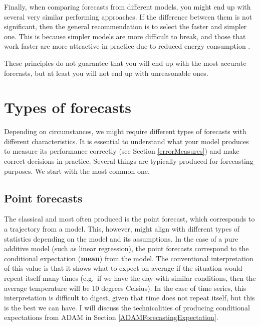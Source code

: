 \documentclass[]{book}
\theoremstyle{definition}
\theoremstyle{definition}
\theoremstyle{definition}
\theoremstyle{definition}
\theoremstyle{remark}
\begin{document}
Finally, when comparing forecasts from different models, you might end up with several very similar performing approaches. If the difference between them is not significant, then the general recommendation is to select the faster and simpler one. This is because simpler models are more difficult to break, and those that work faster are more attractive in practice due to reduced energy consumption \citep[save the planet and stop global warming!][]{Dhar2020}.

These principles do not guarantee that you will end up with the most accurate forecasts, but at least you will not end up with unreasonable ones.

\hypertarget{typesOfForecasts}{%
\section{Types of forecasts}\label{typesOfForecasts}}

Depending on circumstances, we might require different types of forecasts with different characteristics. It is essential to understand what your model produces to measure its performance correctly (see Section \ref{errorMeasures}) and make correct decisions in practice. Several things are typically produced for forecasting purposes. We start with the most common one.

\hypertarget{typesOfForecastsPoint}{%
\subsection{Point forecasts}\label{typesOfForecastsPoint}}

The classical and most often produced is the point forecast, which corresponds to a trajectory from a model. This, however, might align with different types of statistics depending on the model and its assumptions. In the case of a pure additive model (such as linear regression), the point forecasts correspond to the conditional expectation (\textbf{mean}) from the model. The conventional interpretation of this value is that it shows what to expect on average if the situation would repeat itself many times (e.g.~if we have the day with similar conditions, then the average temperature will be 10 degrees Celsius). In the case of time series, this interpretation is difficult to digest, given that time does not repeat itself, but this is the best we can have. I will discuss the technicalities of producing conditional expectations from ADAM in Section \ref{ADAMForecastingExpectation}.
\end{document}
